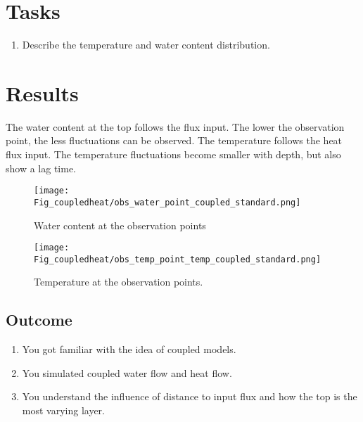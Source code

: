 \section*{Tasks}

\begin{enumerate}
\item Describe the temperature and water content distribution.
\end{enumerate}



\section*{Results}

The water content at the top follows the flux input. The lower the observation point, the less fluctuations can be observed.
The temperature follows the heat flux input. The temperature fluctuations become smaller with depth, but also show a lag time.

\begin{figure}[!h]
\centering
\texttt{[image: Fig\_coupledheat/obs\_water\_point\_coupled\_standard.png]}
\caption{Water content at the observation points}
\end{figure}

\begin{figure}[!h]
\centering
\texttt{[image: Fig\_coupledheat/obs\_temp\_point\_temp\_coupled\_standard.png]}
\caption{Temperature at the observation points.}
\end{figure}

\newpage
\newpage

\subsection{Outcome}
\begin{enumerate}
\item You got familiar with the idea of coupled models. 
\item You simulated coupled water flow and heat flow.
\item You understand the influence of distance to input flux and how the top is the most varying layer.
\end{enumerate}
